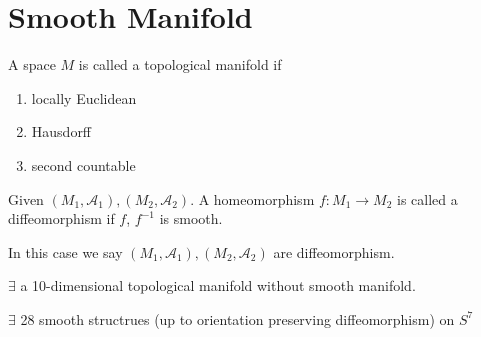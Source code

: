 \section{Smooth Manifold}
\begin{definition}
    A space  $ M  $ is called a topological manifold if 
    \begin{enumerate}
        \item locally Euclidean
        \item Hausdorff
        \item second countable
    \end{enumerate}
\end{definition}
\begin{definition}
    Given  $ (M_1,\mathcal{A}_1),(M_2,\mathcal{A}_2) $. A homeomorphism  $ f:M_1\rightarrow M_2 $ is called a diffeomorphism if   $ f $, $ f^{-1} $  is smooth. 
    
    In this case we say  $ (M_1,\mathcal{A}_1),(M_2,\mathcal{A}_2) $ are diffeomorphism. 
\end{definition}
\begin{theorem}[Kervaire]
     $ \exists  $ a 10-dimensional topological manifold without smooth manifold.
\end{theorem}
\begin{theorem}
     $ \exists  $ 28 smooth structrues (up to orientation preserving diffeomorphism) on  $ S^7 $ 
\end{theorem}
